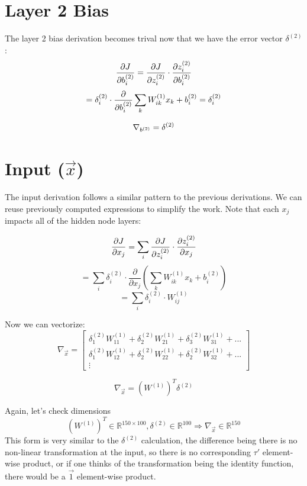 \documentclass[]{article}
\newcommand{\deriv}[2]{%
	\ensuremath{\frac{\partial {#1}}{\partial {#2}}}}
\newcommand{\slayer}[3]{ %
	\ensuremath{{#1}^{(#2)}_{#3}}}
\newcommand{\vlayer}[2]{ %
	\ensuremath{{#1}^{(#2)}}}
\newcommand{\reals}[1]{ %
	\ensuremath{\in \mathbb{R}^{#1}}}
\begin{document}
\section{Layer 2 Bias}
The layer 2 bias derivation becomes trival now that we have the error vector\vlayer{\delta}{2}:
$$\deriv{J}{\slayer{b}{2}{i}} = \deriv{J}{\slayer{z}{2}{i}} \cdot \deriv{\slayer{z}{2}{i}}{\slayer{b}{2}{i}}$$
$$ = \slayer{\delta}{2}{i} \cdot \deriv{}{\slayer{b}{2}{i}}\sum_k \slayer{W}{1}{ik}x_k + \slayer{b}{2}{i} = \slayer{\delta}{2}{i}$$

\begin{equation}\label{eq:b2}
	\nabla_{\vlayer{b}{2}} = \vlayer{\delta}{2}
\end{equation}

\section{ Input ($\vec{x}$)}
The input derivation follows a similar pattern to the previous derivations. We can reuse previously computed expressions to simplify the work. Note that each $x_j$ impacts all of the hidden node layers:

$$\deriv{J}{x_j} = \sum_i\deriv{J}{\slayer{z}{2}{i}} \cdot \deriv{\slayer{z}{2}{i}}{x_j}$$
$$ = \sum_i \slayer{\delta}{2}{i} \cdot \deriv{}{x_j} \left( \sum_k \slayer{W}{1}{ik}x_k + \slayer{b}{2}{i} \right)$$
$$ = \sum_i \slayer{\delta}{2}{i} \cdot \slayer{W}{1}{ij}$$

Now we can vectorize:
\[
\nabla_{\vec{x}} = 
\begin{bmatrix}
\slayer{\delta}{2}{1}\slayer{W}{1}{11} + \slayer{\delta}{2}{2}\slayer{W}{1}{21} + \slayer{\delta}{2}{3}\slayer{W}{1}{31} + ...  \\
\slayer{\delta}{2}{1}\slayer{W}{1}{12} + \slayer{\delta}{2}{2}\slayer{W}{1}{22} + \slayer{\delta}{2}{2}\slayer{W}{1}{32} + ...  \\
\vdots 
\end{bmatrix}
\]

\begin{equation}\label{eq:x}
	\nabla_{\vec{x}} = (\vlayer{W}{1})^T\vlayer{\delta}{2}	
\end{equation}

Again, let's check dimensions
$$(\vlayer{W}{1})^T\reals{150\times100}, \vlayer{\delta}{2}\reals{100} \Rightarrow \nabla_{\vec{x}}\reals{150}$$
This form is very similar to the\vlayer{\delta}{2} calculation, the difference being there is no non-linear transformation at the input, so there is no corresponding $\tau'$ element-wise product, or if one thinks of the transformation being the identity function, there would be a $\vec{1}$ element-wise product.
\end{document}
